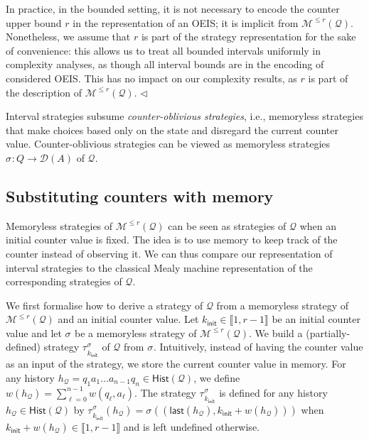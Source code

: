 \documentclass[a4paper,UKenglish,cleveref,autoref,thm-restate,colorlinks]{lipics-v2021}
\newcommand{\init}{\mathsf{init}}
\newcommand{\integerInterval}[1]{\llbracket{}#1\rrbracket{}}
\newcommand{\dist}[1]{\mathcal{D}(#1)}
\newcommand{\mdp}{\mathcal{M}}
\newcommand{\histSet}[1]{\mathsf{Hist}(#1)}
\newcommand{\hist}{h}
\newcommand{\last}[1]{\mathsf{last}(#1)}
\newcommand{\indexPosition}{\ell}
\newcommand{\indexLast}{n}
\newcommand{\weight}{w}
\newcommand{\ocmdp}{\mathcal{Q}}
\newcommand{\ocmdpFin}[2]{\mdp^{\leq #2}(#1)}
\newcommand{\ocStateSpace}{Q}
\newcommand{\ocState}{q}
\newcommand{\ocCount}{k}
\newcommand{\ocActionSpace}{A}
\newcommand{\ocAction}{a}
\newcommand{\counterUB}{r}
\newcommand{\stratGeneric}[1]{{\sigma_{#1}}}
\newcommand{\strat}{\stratGeneric{}}
\newcommand{\stratBGeneric}[1]{{\tau_{#1}}}
\newcommand{\stratB}{\stratBGeneric{}}
\begin{document}
\begin{remark}
  In practice, in the bounded setting, it is not necessary to encode the counter upper bound $\counterUB$ in the representation of an OEIS; it is implicit from $\ocmdpFin{\ocmdp}{\counterUB}$.
  Nonetheless, we assume that $\counterUB$ is part of the strategy representation for the sake of convenience: this allows us to treat all bounded intervals uniformly in complexity analyses, as though all interval bounds are in the encoding of considered OEIS.
  This has no impact on our complexity results, as $\counterUB$ is part of the description of $\ocmdpFin{\ocmdp}{\counterUB}$.
  \hfill$\lhd$
\end{remark}

Interval strategies subsume \textit{counter-oblivious strategies}, i.e., memoryless strategies that make choices based only on the state and disregard the current counter value.
Counter-oblivious strategies can be viewed as memoryless strategies $\strat\colon\ocStateSpace\to\dist{\ocActionSpace}$ of $\ocmdp$.


\subsection{Substituting counters with memory}\label{section:problems:representation}
Memoryless strategies of $\ocmdpFin{\ocmdp}{\counterUB}$ can be seen as strategies of $\ocmdp$ when an initial counter value is fixed.
The idea is to use memory to keep track of the counter instead of observing it.
We can thus compare our representation of interval strategies to the classical Mealy machine representation of the corresponding strategies of $\ocmdp$.

We first formalise how to derive a strategy of $\ocmdp$ from a memoryless strategy of $\ocmdpFin{\ocmdp}{\counterUB}$ and an initial counter value.
Let $\ocCount_\init\in\integerInterval{1, \counterUB-1}$ be an initial counter value and let $\strat$ be a memoryless strategy of $\ocmdpFin{\ocmdp}{\counterUB}$.
We build a (partially-defined) strategy $\stratB_{\ocCount_\init}^{\strat}$ of $\ocmdp$ from $\strat$.
Intuitively, instead of having the counter value as an input of the strategy, we store the current counter value in memory.
For any history $\hist_\ocmdp = \ocState_1\ocAction_1\ldots\ocAction_{\indexLast-1}\ocState_\indexLast\in\histSet{\ocmdp}$, we define $\weight(\hist_\ocmdp) = \sum_{\indexPosition=0}^{\indexLast-1}\weight(\ocState_\indexPosition, \ocAction_\indexPosition)$.
The strategy $\stratB_{\ocCount_\init}^{\strat}$ is defined for any history $\hist_\ocmdp\in\histSet{\ocmdp}$ by $\stratB_{\ocCount_\init}^{\strat}(\hist_\ocmdp) = \strat((\last{\hist_\ocmdp}, \ocCount_\init+\weight(\hist_\ocmdp)))$ when $\ocCount_\init+\weight(\hist_\ocmdp)\in\integerInterval{1, \counterUB-1}$ and is left undefined otherwise.
\end{document}
